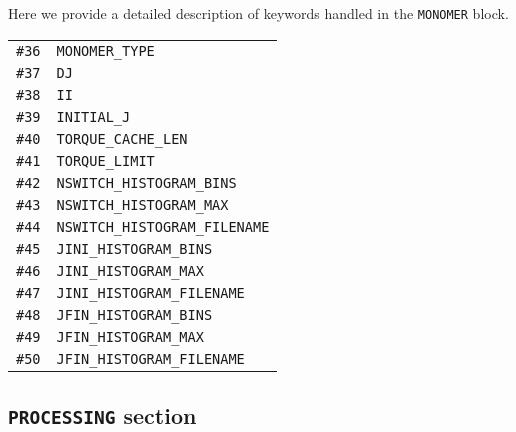 \documentclass[color]{article}
\begin{document}
Here we provide a detailed description of keywords handled in the \texttt{MONOMER} block.

\begin{table}[H]
  \begin{tabular}{ll}
    \texttt{\#36} & \texttt{MONOMER\_TYPE} \\
    \texttt{\#37} & \texttt{DJ} \\
    \texttt{\#38} & \texttt{II} \\
    \texttt{\#39} & \texttt{INITIAL\_J} \\
    \texttt{\#40} & \texttt{TORQUE\_CACHE\_LEN} \\
    \texttt{\#41} & \texttt{TORQUE\_LIMIT} \\
    \texttt{\#42} & \texttt{NSWITCH\_HISTOGRAM\_BINS} \\
    \texttt{\#43} & \texttt{NSWITCH\_HISTOGRAM\_MAX} \\
    \texttt{\#44} & \texttt{NSWITCH\_HISTOGRAM\_FILENAME} \\
    \texttt{\#45} & \texttt{JINI\_HISTOGRAM\_BINS} \\
    \texttt{\#46} & \texttt{JINI\_HISTOGRAM\_MAX} \\
    \texttt{\#47} & \texttt{JINI\_HISTOGRAM\_FILENAME} \\
    \texttt{\#48} & \texttt{JFIN\_HISTOGRAM\_BINS} \\
    \texttt{\#49} & \texttt{JFIN\_HISTOGRAM\_MAX} \\
    \texttt{\#50} & \texttt{JFIN\_HISTOGRAM\_FILENAME} \\
  \end{tabular}
\end{table}

\subsection{\texttt{PROCESSING} section}
\label{subsec:processing-section}
\end{document}
